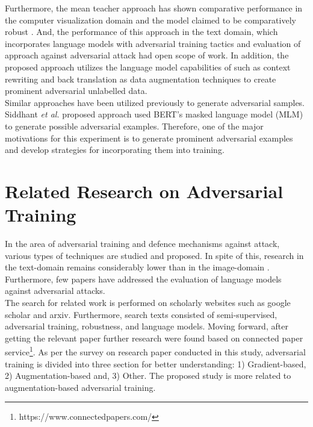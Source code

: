 \documentclass[%
	BCOR=8mm, %
	DIV=12,
	toc=bibliography, %
	toc=listof, %
	oneside, %
	egregdoesnotlikesansseriftitles, %
	]{scrbook}
\begin{document}
Furthermore, the mean teacher approach has shown comparative performance in the computer visualization domain and the model claimed to be comparatively robust \cite{tarvainen_mean_2018}. And, the performance of this approach in the text domain, which incorporates language models with adversarial training tactics  and evaluation of approach against adversarial attack had open scope of work. In addition, the proposed approach utilizes the language model capabilities of such as context rewriting and back translation as data augmentation techniques to create prominent adversarial unlabelled data. \\
Similar approaches have been utilized previously to generate adversarial samples. Siddhant \textit{et al.}  \cite{garg_bae_2020}  proposed approach used BERT's masked language model (MLM) to generate possible adversarial examples. Therefore, one of the major motivations for this experiment is to generate prominent adversarial examples and develop strategies for incorporating them into training.

\chapter{Related Research on Adversarial Training}
\label{chapter:relatedwork}
In the area of adversarial training and defence mechanisms against attack, various types of techniques are studied and proposed. In spite of this, research in the text-domain remains considerably lower than in the image-domain \cite{wang_towards_2021}. Furthermore, few papers have addressed the evaluation of language models against adversarial attacks.\\
The search for related work is performed on scholarly websites such as google scholar and arxiv. Furthermore, search texts consisted of semi-supervised, adversarial training, robustness, and language models. Moving forward,  after getting the relevant paper further research were found based on connected paper service\footnote{https://www.connectedpapers.com/}.
As per the survey on research paper conducted in this study, adversarial training is divided into three section for better understanding: 1) Gradient-based, 2) Augmentation-based and, 3) Other. The proposed study is more related to augmentation-based adversarial training.
\end{document}
